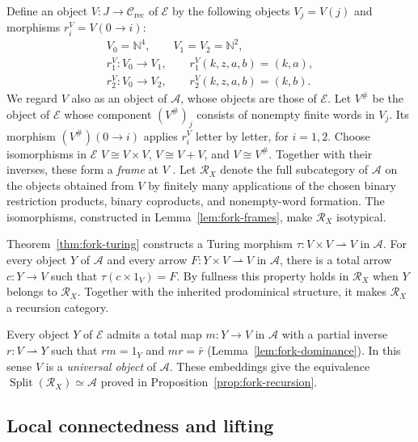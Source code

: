 \documentclass[11pt]{article}
\newcommand{\N}{\mathbb N}
\begin{document}
Define an object $V:J\to\mathcal C_{\mathrm{rec}}$ of $\mathcal E$
by the following objects $V_j=V(j)$ and morphisms
$r_i^V=V(0\to i)$:
\begin{equation}\label{eq:universal-fork}
 \begin{gathered}
 V_0=\N^4,\qquad V_1=V_2=\N^2,\\
 r_1^V:V_0\to V_1,\qquad r_1^V(k,z,a,b)=(k,a),\\
 r_2^V:V_0\to V_2,\qquad r_2^V(k,z,a,b)=(k,b).
 \end{gathered}
\end{equation}
We regard $V$ also as an object of $\mathcal A$, whose objects
are those of $\mathcal E$. Let $V^\#$ be the object of
$\mathcal E$ whose component $(V^\#)_j$ consists of nonempty
finite words in $V_j$. Its morphism $(V^\#)(0\to i)$ applies
$r_i^V$ letter by letter, for $i=1,2$.
Choose isomorphisms in $\mathcal E$
$V\cong V\times V$, $V\cong V+V$, and $V\cong V^\#$.
Together with their inverses, these form a \emph{frame} at $V$
\cite[Section 3]{Heller}.
Let $\mathscr R_X$ denote the full subcategory of $\mathcal A$
on the objects obtained from $V$ by finitely many applications of
the chosen binary restriction products, binary coproducts, and
nonempty-word formation.
The isomorphisms, constructed in Lemma~\ref{lem:fork-frames}, make
$\mathscr R_X$ isotypical.

Theorem~\ref{thm:fork-turing} constructs a Turing morphism
$\tau:V\times V\rightharpoonup V$ in $\mathcal A$.
For every object $Y$ of $\mathcal A$ and every arrow
$F:Y\times V\rightharpoonup V$ in $\mathcal A$, there is a
total arrow $c:Y\to V$ such that $\tau(c\times1_V)=F$.
By fullness this property holds in $\mathscr R_X$ when
$Y$ belongs to $\mathscr R_X$. Together with the inherited
prodominical structure, it makes $\mathscr R_X$ a recursion category.

Every object $Y$ of $\mathcal E$ admits a total map $m:Y\to V$ in
$\mathcal A$ with a partial inverse $r:V\rightharpoonup Y$
such that $rm=1_Y$ and $mr=\bar r$
(Lemma~\ref{lem:fork-dominance}). In this sense $V$ is a
\emph{universal object} of $\mathcal A$.
These embeddings give the equivalence
$\operatorname{Split}(\mathscr R_X)\simeq\mathcal A$
proved in Proposition~\ref{prop:fork-recursion}.

\subsection{Local connectedness and lifting}
\end{document}
